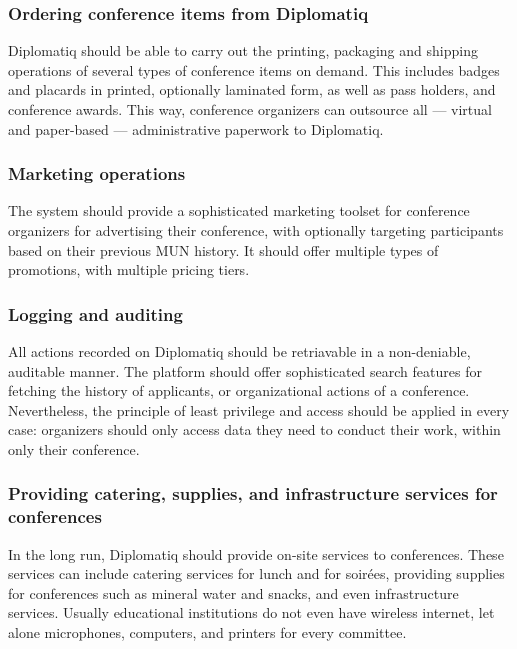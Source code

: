 \subsubsection{Ordering conference items from Diplomatiq}

Diplomatiq should be able to carry out the printing, packaging and shipping operations of several types of conference items on demand. This includes badges and placards in printed, optionally laminated form, as well as pass holders, and conference awards. This way, conference organizers can outsource all — virtual and paper-based — administrative paperwork to Diplomatiq.

\subsubsection{Marketing operations}

The system should provide a sophisticated marketing toolset for conference organizers for advertising their conference, with optionally targeting participants based on their previous MUN history. It should offer multiple types of promotions, with multiple pricing tiers.

\subsubsection{Logging and auditing}

All actions recorded on Diplomatiq should be retriavable in a non-deniable, auditable manner. The platform should offer sophisticated search features for fetching the history of applicants, or organizational actions of a conference. Nevertheless, the principle of least privilege and access should be applied in every case: organizers should only access data they need to conduct their work, within only their conference.

\subsubsection{Providing catering, supplies, and infrastructure services for conferences}

In the long run, Diplomatiq should provide on-site services to conferences. These services can include catering services for lunch and for soirées, providing supplies for conferences such as mineral water and snacks, and even infrastructure services. Usually educational institutions do not even have wireless internet, let alone microphones, computers, and printers for every committee.

